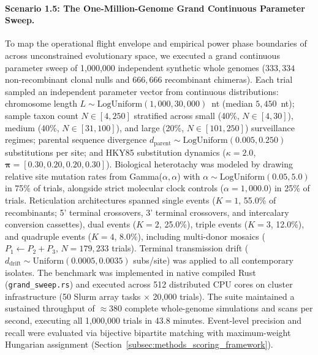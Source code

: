 \paragraph{Scenario 1.5: The One-Million-Genome Grand Continuous Parameter Sweep.}
To map the operational flight envelope and empirical power phase boundaries of \RhizAeon across unconstrained evolutionary space, we executed a grand continuous parameter sweep of 1,000,000 independent synthetic whole genomes ($333{,}334$ non-recombinant clonal nulls and $666{,}666$ recombinant chimeras).
Each trial sampled an independent parameter vector from continuous distributions:
chromosome length $L \sim \text{LogUniform}(1{,}000, 30{,}000)$~nt (median $5{,}450$~nt);
sample taxon count $N \in [4, 250]$ stratified across small (40\%, $N \in [4, 30]$), medium (40\%, $N \in [31, 100]$), and large (20\%, $N \in [101, 250]$) surveillance regimes;
parental sequence divergence $d_{\mathrm{parent}} \sim \text{LogUniform}(0.005, 0.250)$ substitutions per site;
and HKY85 substitution dynamics ($\kappa = 2.0$, $\bm{\pi} = [0.30, 0.20, 0.20, 0.30]$).
Biological heterotachy was modeled by drawing relative site mutation rates from Gamma($\alpha, \alpha$) with $\alpha \sim \text{LogUniform}(0.05, 5.0)$ in 75\% of trials, alongside strict molecular clock controls ($\alpha = 1{,}000.0$) in 25\% of trials.
Reticulation architectures spanned single events ($K=1$, 55.0\% of recombinants; 5' terminal crossovers, 3' terminal crossovers, and intercalary conversion cassettes), dual events ($K=2$, 25.0\%), triple events ($K=3$, 12.0\%), and quadruple events ($K=4$, 8.0\%), including multi-donor mosaics ($P_1 \leftarrow P_2 + P_3$, $N = 179{,}233$ trials).
Terminal transmission drift ($d_{\mathrm{drift}} \sim \text{Uniform}(0.0005, 0.0035)$ subs/site) was applied to all contemporary isolates.
The benchmark was implemented in native compiled Rust (\texttt{grand\_sweep.rs}) and executed across 512 distributed CPU cores on cluster infrastructure (50 Slurm array tasks $\times$ 20,000 trials).
The suite maintained a sustained throughput of $\approx 380$ complete whole-genome simulations and scans per second, executing all 1,000,000 trials in 43.8 minutes.
Event-level precision and recall were evaluated via bijective bipartite matching with maximum-weight Hungarian assignment (Section~\ref{subsec:methods_scoring_framework}).
